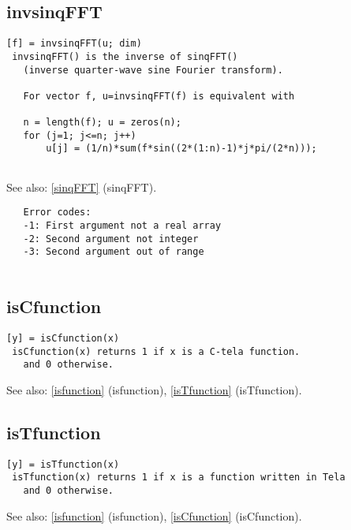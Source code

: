 \documentclass[a4paper]{article}
\begin{document}
\subsection{invsinqFFT\label{invsinqFFT}}

\begin{tscreen}
\begin{verbatim}
[f] = invsinqFFT(u; dim)
 invsinqFFT() is the inverse of sinqFFT()
   (inverse quarter-wave sine Fourier transform).
   
   For vector f, u=invsinqFFT(f) is equivalent with

   n = length(f); u = zeros(n);
   for (j=1; j<=n; j++)
       u[j] = (1/n)*sum(f*sin((2*(1:n)-1)*j*pi/(2*n)));
   
\end{verbatim}

See also: \ref{sinqFFT} {(sinqFFT)}.
\begin{verbatim}
   Error codes:
   -1: First argument not a real array
   -2: Second argument not integer
   -3: Second argument out of range
   
\end{verbatim}
\end{tscreen}





\subsection{isCfunction\label{isCfunction}}

\begin{tscreen}
\begin{verbatim}
[y] = isCfunction(x)
 isCfunction(x) returns 1 if x is a C-tela function.
   and 0 otherwise.
\end{verbatim}

See also: \ref{isfunction} {(isfunction)}, \ref{isTfunction} {(isTfunction)}.
\end{tscreen}





\subsection{isTfunction\label{isTfunction}}

\begin{tscreen}
\begin{verbatim}
[y] = isTfunction(x)
 isTfunction(x) returns 1 if x is a function written in Tela
   and 0 otherwise.
\end{verbatim}

See also: \ref{isfunction} {(isfunction)}, \ref{isCfunction} {(isCfunction)}.
\end{tscreen}
\end{document}
